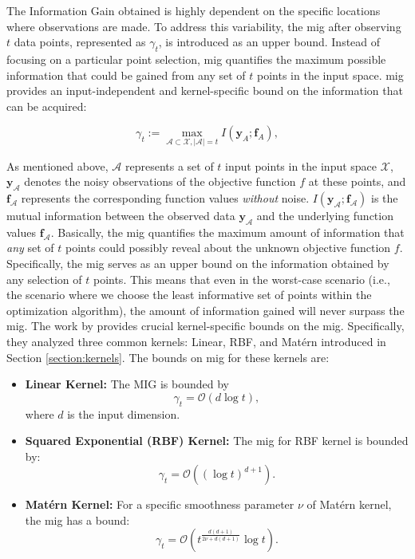 The Information Gain obtained is highly dependent on the specific locations where observations are made. To address this variability, the \acf{mig} after observing $t$ data points, represented as $\gamma_t$, is introduced as an upper bound. Instead of focusing on a particular point selection, \ac{mig} quantifies the maximum possible information that could be gained from any set of $t$ points in the input space. \ac{mig} provides an input-independent and kernel-specific bound on the information that can be acquired:

\[ \gamma_t := \max_{\mathcal{A} \subset \mathcal{X}, \lvert \mathcal{A} \rvert = t} I(\mathbf{y}_A; \mathbf{f}_A),\]

As mentioned above, $\mathcal{A}$ represents a set of $t$ input points in the input space $\mathcal{X}$, $\mathbf{y}_\mathcal{A}$ denotes the noisy observations of the objective function $f$ at these points, and $\mathbf{f}_\mathcal{A}$ represents the corresponding function values \textit{without} noise. $I(\mathbf{y}_\mathcal{A}; \mathbf{f}_\mathcal{A})$ is the mutual information between the observed data $\mathbf{y}_\mathcal{A}$ and the underlying function values $\mathbf{f}_\mathcal{A}$. Basically, the \ac{mig} quantifies the maximum amount of information that \textit{any} set of $t$ points could possibly reveal about the unknown objective function $f$. Specifically, the \ac{mig} serves as an upper bound on the information obtained by any selection of $t$ points. This means that even in the worst-case scenario (i.e., the scenario where we choose the least informative set of points within the optimization algorithm), the amount of information gained will never surpass the \ac{mig}. The work by \citet{srinivas2009gaussian} provides crucial kernel-specific bounds on the \ac{mig}. Specifically, they analyzed three common kernels: Linear, RBF, and Mat\'ern introduced in Section \ref{section:kernels}. The bounds on \ac{mig} for these kernels are:

\begin{itemize}
    \item \textbf{Linear Kernel:}
    The MIG is bounded by
    \[ \gamma_t = \mathcal{O}(d \log t),\]
    where $d$ is the input dimension.

    \item \textbf{Squared Exponential (RBF) Kernel:} The \ac{mig} for RBF kernel is bounded by:
    \[ \gamma_t = \mathcal{O}((\log t)^{d+1}). \]


    \item \textbf{Mat\'ern Kernel:} For a specific smoothness parameter $\nu$ of Mat\'ern kernel, the \ac{mig} has a bound:
     \[ \gamma_t = \mathcal{O} \left( t^\frac{d(d+1)}{2\nu+ d(d+1)} \log t \right). \]
    
\end{itemize}





